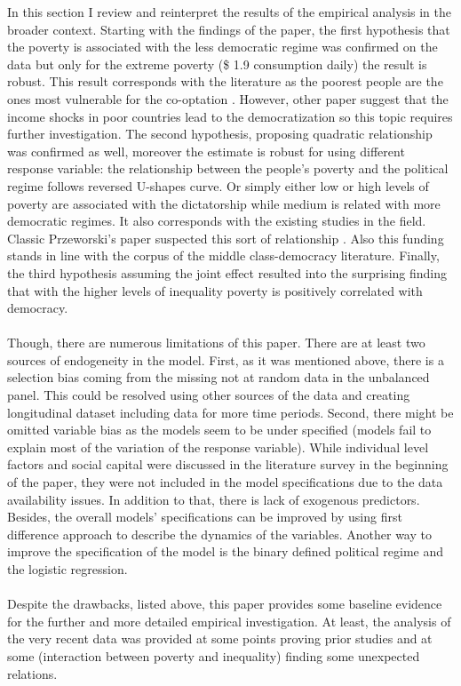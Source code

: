 \documentclass[a4paper, 12pt]{article}
\begin{document}
    In this section I review and reinterpret the results of the empirical analysis in the broader context. Starting with the findings of the paper, the first hypothesis that the poverty is associated with the less democratic regime was confirmed on the data but only for the extreme poverty (\$ 1.9 consumption daily) the result is robust. This result corresponds with the literature as the poorest people are the ones most vulnerable for the co-optation \parencite{voting_for_autocracy}. However, other paper suggest that the income shocks in poor countries lead to the democratization \parencite{rain_dem} so this topic requires further investigation. The second hypothesis, proposing quadratic relationship was confirmed as well, moreover the estimate is robust for using different response variable: the relationship between the people's poverty and the political regime follows reversed U-shapes curve. Or simply either low or high levels of poverty are associated with the dictatorship while medium is related with more democratic regimes.  It also corresponds with the existing studies in the field. Classic Przeworski's paper suspected  this sort of relationship \parencite{democracy_development}. Also this funding stands in line with the corpus of the middle class-democracy literature. Finally, the third hypothesis assuming the joint effect resulted into the surprising finding that with the higher levels of inequality poverty is positively correlated with democracy.
    \\\\
    Though, there are numerous limitations of this paper. There are at least two sources of endogeneity in the model. First, as it was mentioned above, there is a selection bias coming from the missing not at random data in the unbalanced panel. This could be resolved using other sources of the data and creating longitudinal dataset including data for more time periods. Second, there might be omitted variable bias as the models seem to be under specified (models fail to explain most of the variation of the response variable). While individual level factors and social capital were discussed in the literature survey in the beginning of the paper, they were not included in the model specifications due to the data availability issues. In addition to that, there is lack of exogenous predictors. Besides, the overall models' specifications can be improved by using first difference approach to describe the dynamics of the variables. Another way to improve the specification of the model is the binary defined political regime and the logistic regression.
    \\\\
    Despite the drawbacks, listed above, this paper provides some baseline evidence for the further and more detailed empirical investigation. At least, the analysis of the very recent data was provided at some points proving prior studies and at some (interaction between poverty and inequality) finding some unexpected relations.
    
\end{document}
